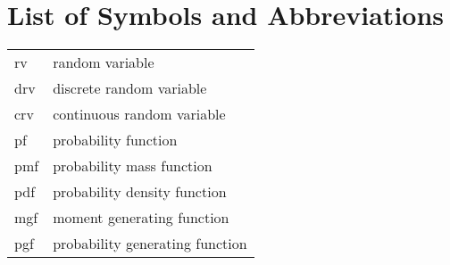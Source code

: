 \chapter{List of Symbols and Abbreviations}%
\label{chp:list_of_symbols_and_abbreviations}

\begin{longtable}{l l}
  rv & random variable \\
  drv & discrete random variable \\
  crv & continuous random variable \\
  pf & probability function \\
  pmf & probability mass function \\
  pdf & probability density function \\
  mgf & moment generating function \\
  pgf & probability generating function
\end{longtable}

